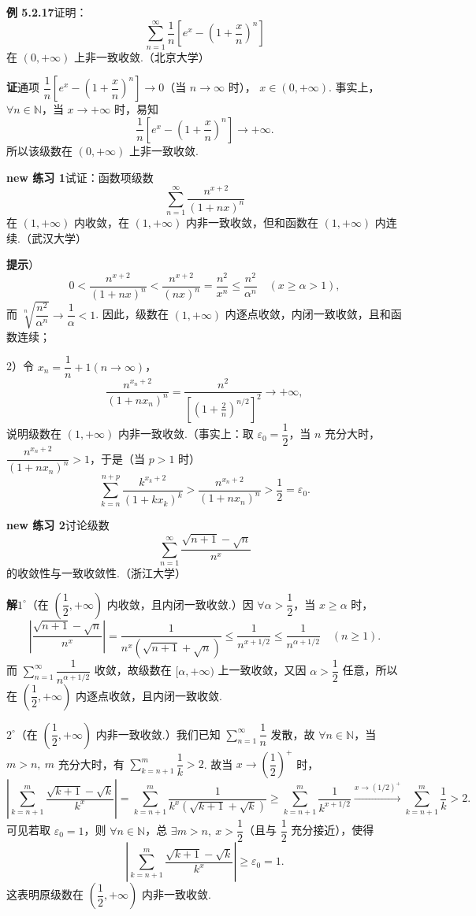 \documentclass[UTF8,12pt,a4paper,fontset=fandol]{ctexart}
\begin{document}
\noindent\textbf{例 5.2.17}\quad 证明：
\[
  \sum_{n=1}^{\infty}\frac1n\left[e^x-\left(1+\frac{x}{n}\right)^n\right]
\]
在 $(0,+\infty)$ 上非一致收敛.（北京大学）

\noindent\textbf{证}\quad 通项
$\dfrac1n\left[e^x-\left(1+\dfrac{x}{n}\right)^n\right]\to0$（当 $n\to\infty$ 时），
$x\in(0,+\infty)$. 事实上，$\forall n\in\mathbb N$，当 $x\to+\infty$ 时，易知
\[
  \frac1n\left[e^x-\left(1+\frac{x}{n}\right)^n\right]\to+\infty.
\]
所以该级数在 $(0,+\infty)$ 上非一致收敛.

\noindent\textbf{new 练习 1}\quad 试证：函数项级数
\[
  \sum_{n=1}^{\infty}\frac{n^{x+2}}{(1+nx)^n}
\]
在 $(1,+\infty)$ 内收敛，在 $(1,+\infty)$ 内非一致收敛，但和函数在 $(1,+\infty)$ 内连续.（武汉大学）

\noindent\textbf{提示}）
\[
  0<\frac{n^{x+2}}{(1+nx)^n}
  <\frac{n^{x+2}}{(nx)^n}
  =\frac{n^2}{x^n}\le\frac{n^2}{\alpha^n}\quad(x\ge\alpha>1),
\]
而 $\sqrt[n]{\dfrac{n^2}{\alpha^n}}\to\dfrac1\alpha<1$. 因此，级数在
$(1,+\infty)$ 内逐点收敛，内闭一致收敛，且和函数连续；

2）令 $x_n=\dfrac1n+1(n\to\infty)$，
\[
  \frac{n^{x_n+2}}{(1+nx_n)^n}
  =\frac{n^2}{\left[\left(1+\frac2n\right)^{n/2}\right]^2}\to+\infty,
\]
说明级数在 $(1,+\infty)$ 内非一致收敛.（事实上：取 $\varepsilon_0=\dfrac12$，当 $n$ 充分大时，
$\dfrac{n^{x_n+2}}{(1+nx_n)^n}>1$，于是（当 $p>1$ 时）
\[
  \sum_{k=n}^{n+p}\frac{k^{x_k+2}}{(1+kx_k)^k}
  >\frac{n^{x_n+2}}{(1+nx_n)^n}>\frac12=\varepsilon_0.
\]

\noindent\textbf{new 练习 2}\quad 讨论级数
\[
  \sum_{n=1}^{\infty}\frac{\sqrt{n+1}-\sqrt n}{n^x}
\]
的收敛性与一致收敛性.（浙江大学）

\noindent\textbf{解}\quad $1^\circ$（在 $\left(\dfrac12,+\infty\right)$ 内收敛，且内闭一致收敛.）因
$\forall\alpha>\dfrac12$，当 $x\ge\alpha$ 时，
\[
  \left|\frac{\sqrt{n+1}-\sqrt n}{n^x}\right|
  =\frac1{n^x(\sqrt{n+1}+\sqrt n)}
  \le\frac1{n^{x+1/2}}\le\frac1{n^{\alpha+1/2}}\quad(n\ge1).
\]
而 $\displaystyle\sum_{n=1}^{\infty}\dfrac1{n^{\alpha+1/2}}$ 收敛，故级数在
$[\alpha,+\infty)$ 上一致收敛，又因 $\alpha>\dfrac12$ 任意，所以在
$\left(\dfrac12,+\infty\right)$ 内逐点收敛，且内闭一致收敛.

$2^\circ$（在 $\left(\dfrac12,+\infty\right)$ 内非一致收敛.）我们已知
$\displaystyle\sum_{n=1}^{\infty}\dfrac1n$ 发散，故 $\forall n\in\mathbb N$，当
$m>n,\ m$ 充分大时，有
$\displaystyle\sum_{k=n+1}^m\dfrac1k>2$. 故当
$x\to\left(\dfrac12\right)^+$ 时，
\[
  \left|\sum_{k=n+1}^m\frac{\sqrt{k+1}-\sqrt k}{k^x}\right|
  =\sum_{k=n+1}^m\frac1{k^x(\sqrt{k+1}+\sqrt k)}
  \ge \sum_{k=n+1}^m\frac1{k^{x+1/2}}
  \xrightarrow{x\to(1/2)^+}\sum_{k=n+1}^m\frac1k>2.
\]
可见若取 $\varepsilon_0=1$，则 $\forall n\in\mathbb N$，总 $\exists m>n,\ x>\dfrac12$（且与
$\dfrac12$ 充分接近），使得
\[
  \left|\sum_{k=n+1}^m\frac{\sqrt{k+1}-\sqrt k}{k^x}\right|\ge\varepsilon_0=1.
\]
这表明原级数在 $\left(\dfrac12,+\infty\right)$ 内非一致收敛.
\end{document}
